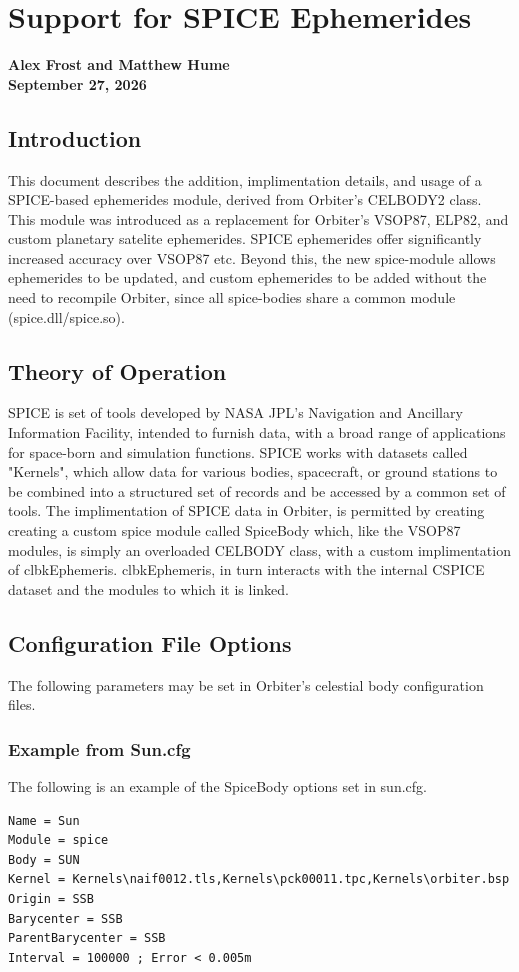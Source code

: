 \documentclass[Orbiter Technical Reference.tex]{subfiles}
\begin{document}
\section{Support for SPICE Ephemerides}
\textbf{Alex Frost and Matthew Hume}\\
\textbf{September 27, 2026}


\subsection{Introduction}
This document describes the addition, implimentation details, and usage of a SPICE-based ephemerides module, derived from Orbiter's CELBODY2 class.
This module was introduced as a replacement for Orbiter's VSOP87, ELP82, and custom planetary satelite ephemerides.
SPICE ephemerides offer significantly increased accuracy over VSOP87 etc.
Beyond this, the new spice-module allows ephemerides to be updated, and custom ephemerides to be added without the need to recompile Orbiter, since all spice-bodies share a common module (spice.dll/spice.so).

\subsection{Theory of Operation}
SPICE\cite{SPICE} is set of tools developed by NASA JPL's Navigation and Ancillary Information Facility, intended to furnish data, with a broad range of applications for space-born and simulation functions.
SPICE works with datasets called "Kernels", which allow data for various bodies, spacecraft, or ground stations to be combined into a structured set of records and be accessed by a common set of tools.
The implimentation of SPICE data in Orbiter, is permitted by creating creating a custom spice module called SpiceBody which, like the VSOP87 modules, is simply an overloaded CELBODY class, with a custom implimentation of clbkEphemeris.
clbkEphemeris, in turn interacts with the internal CSPICE dataset and the modules to which it is linked.

\subsection{Configuration File Options}
The following parameters may be set in Orbiter's celestial body configuration files.
\subsubsection{Example from Sun.cfg}
The following is an example of the SpiceBody options set in sun.cfg.
\begin{verbatim}
Name = Sun                                                                  
Module = spice
Body = SUN
Kernel = Kernels\naif0012.tls,Kernels\pck00011.tpc,Kernels\orbiter.bsp
Origin = SSB
Barycenter = SSB
ParentBarycenter = SSB
Interval = 100000 ; Error < 0.005m
\end{verbatim}
\end{document}
